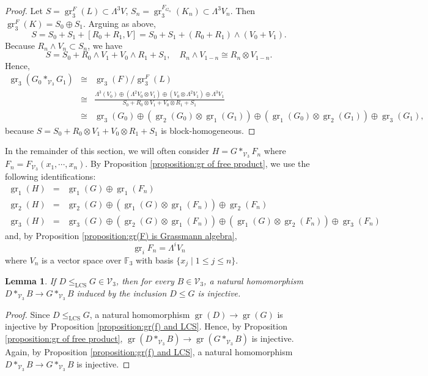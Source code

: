 \documentclass[11pt,reqno]{article}
\newtheorem{lemma}[theorem]{Lemma}
\theoremstyle{definition}
\theoremstyle{remark}
\DeclareMathOperator{\gr}{gr}
\newcommand{\LCS}{\mathrm{LCS}}
\begin{document}
\begin{proof}
Let $S=\gr_3^F(L)\subset \Lambda^3V$, 
$S_n=\gr_3^{F_{G_n}}(K_n)\subset \Lambda^3V_n$.
Then $\gr_3^F(K)=S_0\oplus S_1$.
Arguing as above,
\[S=S_0+S_1+[R_0+R_1,V]=S_0+S_1+(R_0+R_1)\wedge(V_0+V_1).\]
Because $R_n\wedge V_n\subset S_n$, we have
\[
    S=S_0+R_0\wedge V_1+V_0\wedge R_1+S_1, \quad R_n\wedge V_{1-n}\cong R_n\otimes V_{1-n}.
\]
Hence,
\begin{eqnarray*}
    \gr_3(G_0*_{\mathcal V_3} G_1) 
    &\cong&
    \gr_3(F)/\gr_3^F(L)\\ 
    &\cong&
    \frac{\Lambda^3(V_0)\oplus(\Lambda^2V_0\otimes V_1) \oplus (V_0\otimes \Lambda^2V_1)\oplus\Lambda^3 V_1}{S_0+R_0\otimes V_1+V_0\otimes R_1 + S_1}\\ 
    &\cong&
    \gr_3(G_0)\oplus (\gr_2(G_0)\otimes \gr_1(G_1))\oplus (\gr_1(G_0)\otimes \gr_2(G_1))\oplus \gr_3(G_1),
\end{eqnarray*}
because $S=S_0+R_0\otimes V_1+V_0\otimes R_1+S_1$ is block-homogeneous.
\end{proof}

In the remainder of this section, we will often consider $H=G*_{\mathcal V_3} F_n$ where $F_n=F_{\mathcal V_3}(x_1,\cdots, x_n)$.
By Proposition \ref{proposition:gr of free product}, we use the following identifications:
    \begin{eqnarray*}
        \gr_1(H)&=& \gr_1(G)\oplus \gr_1(F_n)\\ 
        \gr_2(H) &=& \gr_2(G)\oplus (\gr_1(G)\otimes \gr_1(F_{n})) \oplus \gr_2(F_{n})\\
        \gr_3(H) &=& \gr_3(G)\oplus (\gr_2(G)\otimes \gr_1(F_{n})) \oplus (\gr_1(G)\otimes \gr_2(F_{n})) \oplus \gr_3(F_{n})
    \end{eqnarray*}
    and, by Proposition \ref{proposition:gr(F) is Grassmann algebra},
    \[
        \gr_i F_{n} = \Lambda^i V_n
        \]
    where $V_n$ is a vector space over $\mathbb F_3$ with basis $\{x_j\mid 1\leq j\leq n\}$.



\begin{lemma}\label{lemma:free-product-amalgam}
    If $D\leq_{\LCS}G\in\mathcal V_3$, then for every $B\in\mathcal V_3$,
    a natural homomorphism
    $D*_{\mathcal V_3}B\to G*_{\mathcal V_3}B$ induced by the inclusion
    $D\leq G$ is injective.
\end{lemma}
\begin{proof}
    Since $D\leq_\LCS G$, a natural homomorphism $\gr(D) \to \gr(G)$ is injective by Proposition \ref{proposition:gr(f) and LCS}.
    Hence, by Proposition \ref{proposition:gr of free product}, $\gr(D*_{\mathcal V_3}B) \to \gr(G*_{\mathcal V_3}B)$ is injective.
    Again, by Proposition \ref{proposition:gr(f) and LCS},
    a natural homomorphism
    $D*_{\mathcal V_3}B\to G*_{\mathcal V_3}B$ is injective. 
\end{proof} 
\end{document}
